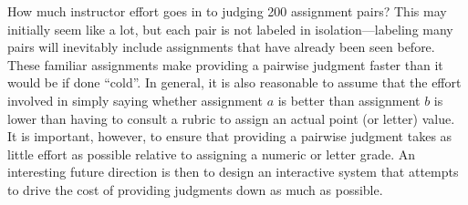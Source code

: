 How much instructor effort goes in to judging 200 assignment pairs? This
may initially seem like a lot, but each pair is not labeled in
isolation---labeling many pairs will inevitably include assignments that
have already been seen before. These familiar assignments make providing a
pairwise judgment faster than it would be if done ``cold''. In general, it
is also reasonable to assume that the effort involved in simply saying
whether assignment $a$ is better than assignment $b$ is lower than having
to consult a rubric to assign an actual point (or letter) value. It is
important, however, to ensure that providing a pairwise judgment takes as
little effort as possible relative to assigning a numeric or letter grade.
An interesting future direction is then to design an interactive system
that attempts to drive the cost of providing judgments down as much as
possible.
